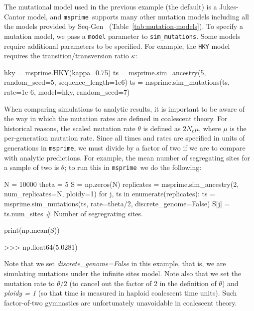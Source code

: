 \documentclass[graybox]{svmult}
\newcommand{\msprime}[0]{\texttt{msprime}}
\begin{document}
The mutational model used in the previous example (the
default) is a Jukes-Cantor model, and
\msprime\ supports many other mutation models
including all the models provided by
Seq-Gen~\citep{rambaut1997seq}
(Table~\ref{tab:mutation-models}).
To specify a mutation model, we pass a \texttt{model} parameter to \texttt{sim\_mutations}.
Some models
require additional parameters to be specified.
For example, the \texttt{HKY} model requires the transition/transversion
ratio $\kappa$:

\begin{pythoncode}
hky = msprime.HKY(kappa=0.75)
ts = msprime.sim_ancestry(5, random_seed=5, sequence_length=1e6)
ts = msprime.sim_mutations(ts, rate=1e-6, model=hky, random_seed=7)
\end{pythoncode}

When comparing simulations to analytic results, it is important to be aware of the way in which the
mutation rates are defined in coalescent theory. For historical reasons,
the scaled mutation rate \(\theta\) is defined as \(2N_e \mu\), where
\(\mu\) is the per-generation mutation rate. Since all times and rates
are specified in units of generations in \msprime, we must divide by a
factor of two if we are to compare with analytic predictions. For
example, the mean number of segregating sites for a sample of two is
\(\theta\); to run this in \msprime\ we do the following:

\begin{pythoncode}
N = 10000
theta = 5
S = np.zeros(N)
replicates = msprime.sim_ancestry(2, num_replicates=N, ploidy=1)
for j, ts in enumerate(replicates):
    ts = msprime.sim_mutations(ts, rate=theta/2,
        discrete_genome=False)
    S[j] = ts.num_sites  # Number of segregrating sites.

print(np.mean(S))

>>> np.float64(5.0281)

\end{pythoncode}

Note that we set \emph{discrete\_genome=False} in this example, that is,
we are simulating mutations under the infinite sites model.
Note also that we set the mutation rate to \(\theta / 2\) (to cancel out
the factor of 2 in the definition of \(\theta\)) and \emph{ploidy = 1} (so
that time is measured in haploid coalescent time units).
Such factor-of-two gymnastics are unfortunately unavoidable in coalescent
theory.
\end{document}
